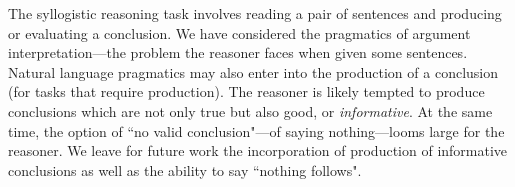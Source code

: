 \documentclass[10pt,letterpaper]{article}
\begin{document}


The syllogistic reasoning task involves reading a pair of sentences and producing or evaluating a conclusion. We have considered the pragmatics of argument interpretation---the problem the reasoner faces when given some sentences. Natural language pragmatics may also enter into the production of a conclusion (for tasks that require production). The reasoner is likely tempted to produce conclusions which are not only true but also good, or \emph{informative}. At the same time, the option of ``no valid conclusion"---of saying nothing---looms large for the reasoner. We leave for future work the incorporation of production of informative conclusions as well as the ability to say ``nothing follows".



\end{document}
